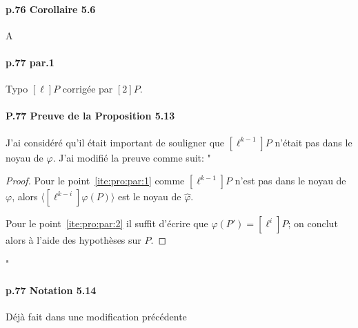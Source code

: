 \documentclass[10pt,a4paper]{article}
\theoremstyle{plain}
\theoremstyle{definition}
\theoremstyle{definition}
\theoremstyle{definition}
\theoremstyle{definition}
\theoremstyle{definition}
\theoremstyle{remark}
\theoremstyle{remark}
\theoremstyle{definition}
\begin{document}
\paragraph{p.76 Corollaire 5.6}{A}

\paragraph{p.77 par.1}{Typo $[\ell]P$ corrigée par $[2]P$.}

\paragraph{P.77 Preuve de la Proposition 5.13}{J'ai considéré qu'il était 
important de souligner que $[\ell^{k-1}]P$ n'était pas dans le noyau de 
$\varphi$. J'ai modifié la preuve comme suit: "
\begin{proof}
Pour le point~\eqref{ite:pro:par:1} comme $[\ell^{k-1}]P$ n'est pas dans le 
noyau de $\varphi$, alors $\langle [\ell^{k-i}]\varphi(P) \rangle $ est le 
noyau de $\widehat{\varphi}$. 

Pour le point~\eqref{ite:pro:par:2} il suffit d'écrire que $\widehat{\varphi}
(P')= [\ell^i] P$; on conclut alors à l'aide
des hypothèses sur $P$.
\end{proof}
"}

\paragraph{p.77 Notation 5.14}{Déjà fait dans une modification précédente}
\end{document}
